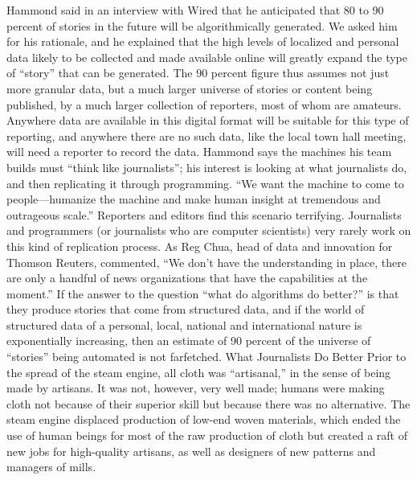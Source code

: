 Hammond said in an interview with Wired that he anticipated that 80 to
90 percent of stories in the future will be algorithmically generated. We asked
him for his rationale, and he explained that the high levels of localized and personal
data likely to be collected and made available online will greatly expand
the type of ``story'' that can be generated. The 90 percent figure thus assumes
not just more granular data, but a much larger universe of stories or content
being published, by a much larger collection of reporters, most of whom are
amateurs. Anywhere data are available in this digital format will be suitable for
this type of reporting, and anywhere there are no such data, like the local town
hall meeting, will need a reporter to record the data.
Hammond says the machines his team builds must ``think like journalists''; his
interest is looking at what journalists do, and then replicating it through programming.
``We want the machine to come to people—humanize the machine
and make human insight at tremendous and outrageous scale.''
Reporters and editors find this scenario terrifying. Journalists and programmers
(or journalists who are computer scientists) very rarely work on this kind of
replication process. As Reg Chua, head of data and innovation for Thomson
Reuters, commented, ``We don’t have the understanding in place, there are only
a handful of news organizations that have the capabilities at the moment.''
If the answer to the question ``what do algorithms do better?'' is that they produce
stories that come from structured data, and if the world of structured data
of a personal, local, national and international nature is exponentially increasing,
then an estimate of 90 percent of the universe of ``stories'' being automated is
not farfetched.
What Journalists Do Better
Prior to the spread of the steam engine, all cloth was ``artisanal,'' in the sense of
being made by artisans. It was not, however, very well made; humans were making
cloth not because of their superior skill but because there was no alternative.
The steam engine displaced production of low-end woven materials, which
ended the use of human beings for most of the raw production of cloth but
created a raft of new jobs for high-quality artisans, as well as designers of new
patterns and managers of mills.

